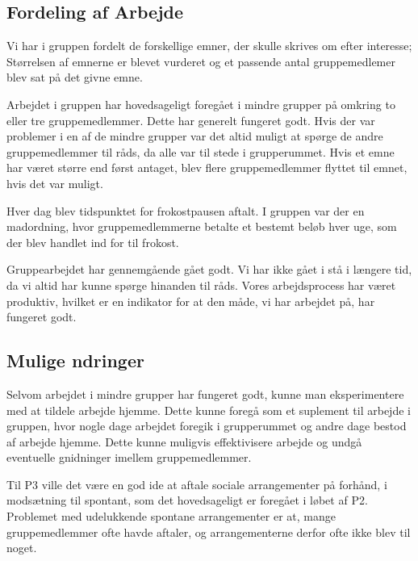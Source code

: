 \subsection{Fordeling af Arbejde}

Vi har i gruppen fordelt de forskellige emner, der skulle skrives om efter interesse; St\o{}rrelsen af emnerne er blevet vurderet og et passende antal gruppemedlemer blev sat p\aa{} det givne emne.

Arbejdet i gruppen har hovedsageligt foreg\aa{}et i mindre grupper p\aa{} omkring to eller tre gruppemedlemmer. Dette har generelt fungeret godt. 
Hvis der var problemer i en af de mindre grupper var det altid muligt at sp\o{}rge de andre gruppemedlemmer til r\aa{}ds, da alle var til stede i grupperummet.
Hvis et emne har v\ae{}ret st\o{}rre end f\o{}rst antaget, blev flere gruppemedlemmer flyttet til emnet, hvis det var muligt.

Hver dag blev tidspunktet for frokostpausen aftalt. I gruppen var der en madordning, hvor gruppemedlemmerne betalte et bestemt bel\o{}b hver uge, som der blev handlet ind for til frokost. 

Gruppearbejdet har gennemg\aa{}ende g\aa{}et godt. Vi har ikke g\aa{}et i st\aa{} i l\ae{}ngere tid, da vi altid har kunne sp\o{}rge hinanden til r\aa{}ds. Vores arbejdsprocess har v\ae{}ret produktiv, hvilket er en indikator for at den m\aa{}de, vi har arbejdet p\aa{}, har fungeret godt.

\subsection{Mulige \Ae{}ndringer}

Selvom arbejdet i mindre grupper har fungeret godt, kunne man eksperimentere med at tildele arbejde hjemme. Dette kunne foreg\aa{} som et suplement til arbejde i gruppen, hvor nogle dage arbejdet foregik i grupperummet og andre dage bestod af arbejde hjemme.
Dette kunne muligvis effektivisere arbejde og undg\aa{} eventuelle gnidninger imellem gruppemedlemmer.

Til P3 ville det v\ae{}re en god ide at aftale sociale arrangementer p\aa{} forh\aa{}nd, i mods\ae{}tning til spontant, som det hovedsageligt er foreg\aa{}et i l\o{}bet af P2. 
Problemet med udelukkende spontane arrangementer er at, mange gruppemedlemmer ofte havde aftaler, og arrangementerne derfor ofte ikke blev til noget.